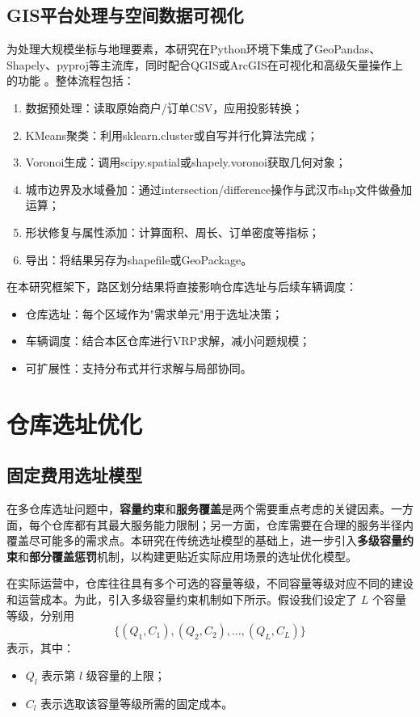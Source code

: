 \documentclass[12pt,a4paper,twoside]{ctexbook}
\begin{document}
\subsection{GIS平台处理与空间数据可视化}

为处理大规模坐标与地理要素，本研究在Python环境下集成了GeoPandas、Shapely、pyproj等主流库，同时配合QGIS或ArcGIS在可视化和高级矢量操作上的功能 \cite{Rey2007}。整体流程包括：

\begin{enumerate}
    \item 数据预处理：读取原始商户/订单CSV，应用投影转换；
    \item KMeans聚类：利用sklearn.cluster或自写并行化算法完成；
    \item Voronoi生成：调用scipy.spatial或shapely.voronoi获取几何对象；
    \item 城市边界及水域叠加：通过intersection/difference操作与武汉市shp文件做叠加运算；
    \item 形状修复与属性添加：计算面积、周长、订单密度等指标；
    \item 导出：将结果另存为shapefile或GeoPackage。
\end{enumerate}

在本研究框架下，路区划分结果将直接影响仓库选址与后续车辆调度：
\begin{itemize}
    \item 仓库选址：每个区域作为"需求单元"用于选址决策；
    \item 车辆调度：结合本区仓库进行VRP求解，减小问题规模；
    \item 可扩展性：支持分布式并行求解与局部协同。
\end{itemize}
\section{仓库选址优化}
\subsection{固定费用选址模型}

在多仓库选址问题中，\textbf{容量约束}和\textbf{服务覆盖}是两个需要重点考虑的关键因素。一方面，每个仓库都有其最大服务能力限制；另一方面，仓库需要在合理的服务半径内覆盖尽可能多的需求点。本研究在传统选址模型的基础上，进一步引入\textbf{多级容量约束}和\textbf{部分覆盖惩罚}机制，以构建更贴近实际应用场景的选址优化模型。

在实际运营中，仓库往往具有多个可选的容量等级，不同容量等级对应不同的建设和运营成本。为此，引入多级容量约束机制如下所示。假设我们设定了 $L$ 个容量等级，分别用
\[
\{(Q_1, C_1), (Q_2, C_2), \ldots, (Q_L, C_L)\}
\]
表示，其中：
\begin{itemize}
  \item $Q_l$ 表示第 $l$ 级容量的上限；
  \item $C_l$ 表示选取该容量等级所需的固定成本。
\end{itemize}
\end{document}
